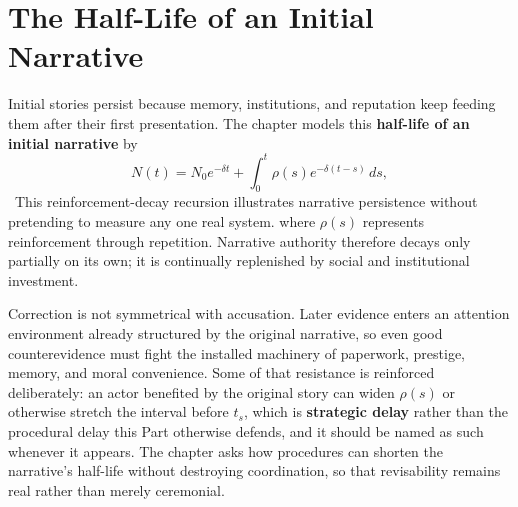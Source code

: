 
\chapter{The Half-Life of an Initial Narrative}
\label{ch:ch021}

Initial stories persist because memory, institutions, and reputation keep feeding them after their first presentation. The chapter models this \textbf{half-life of an initial narrative} by
\[
N(t)=N_0e^{-\delta t}+\int_0^t \rho(s)e^{-\delta(t-s)}\,ds,
\]
\ToyModel\ This reinforcement-decay recursion illustrates narrative persistence without pretending to measure any one real system.
where \(\rho(s)\) represents reinforcement through repetition. Narrative authority therefore decays only partially on its own; it is continually replenished by social and institutional investment.

Correction is not symmetrical with accusation. Later evidence enters an attention environment already structured by the original narrative, so even good counterevidence must fight the installed machinery of paperwork, prestige, memory, and moral convenience. Some of that resistance is reinforced deliberately: an actor benefited by the original story can widen \(\rho(s)\) or otherwise stretch the interval before \(t_s\), which is \textbf{strategic delay} rather than the procedural delay this Part otherwise defends, and it should be named as such whenever it appears. The chapter asks how procedures can shorten the narrative's half-life without destroying coordination, so that revisability remains real rather than merely ceremonial.
